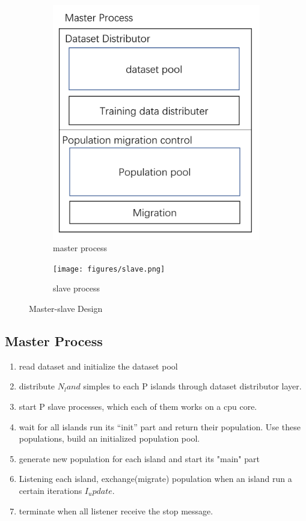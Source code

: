 \documentclass[conference]{IEEEtran}
\begin{document}
  \begin{figure}[H]
    \centering
    \begin{subfigure}{0.45\linewidth}
      \centering
      \includegraphics[width=0.9\linewidth]{figures/master.png}
      \caption{master process}
      \label{fig:sfig1}
    \end{subfigure}%
    \begin{subfigure}{0.45\linewidth}
      \centering
      \texttt{[image: figures/slave.png]}
      \caption{slave process}
      \label{fig:sfig2}
    \end{subfigure}
    
    \caption{Master-slave Design}
    \label{fig:fig}
    \end{figure}
  \subsection{Master Process}
  \begin{enumerate}
  \item read dataset and initialize the dataset pool
  \item distribute $N_land$ simples to each P islands through dataset distributor layer.
  \item start P slave processes, which each of them works on a cpu core.
  \item wait for all islands run its “init” part and return their population. Use these populations, build an initialized population pool.
  \item generate new population for each island and start its "main" part
  \item Listening each island, exchange(migrate) population when an island run a certain iterations $I_update$.
  \item terminate when all listener receive the stop message.
  \end{enumerate}
\end{document}
